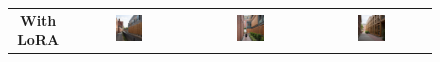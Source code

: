 \begin{figure}[H]
  \centering
  {\footnotesize
  \renewcommand{\arraystretch}{1.1}
  \setlength{\tabcolsep}{4pt}
  \begin{tabular}{c c c c}
    \textbf{With LoRA} &
    \includegraphics[width=0.25\textwidth]{Images/Results/Architect-B_unstructured-phase/generated_images/1/Met_lora_00001_.png} &
    \includegraphics[width=0.25\textwidth]{Images/Results/Architect-B_unstructured-phase/generated_images/1/Met_lora_00002_.png} &
    \includegraphics[width=0.25\textwidth]{Images/Results/Architect-B_unstructured-phase/generated_images/1/Met_lora_00003_.png} \\


\end{tabular}}
\end{figure}
